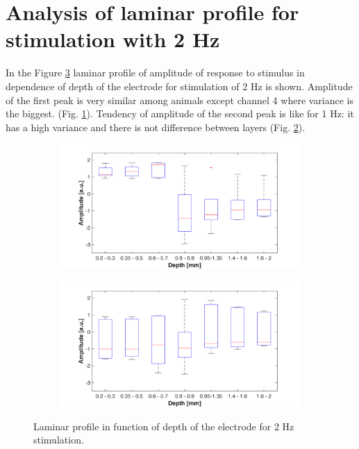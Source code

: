 \documentclass{pracalicmgr}
\begin{document}
 
 \section{Analysis of laminar profile for stimulation with 2 Hz}
  
    In the Figure \ref{rys:profil_2Hz_amp} laminar profile of amplitude of response to stimulus in dependence of depth of the electrode for stimulation of 2 Hz is shown. Amplitude of the first peak is very similar among animals except channel 4 where variance is the biggest. (Fig. \ref{rys:profil_2Hz_amp1}). Tendency of amplitude of the second peak is like for 1 Hz: it has a high variance and there is not difference between layers (Fig. \ref{rys:profil_2Hz_amp2}).
  
 	\begin{figure}[H]
 	\begin{subfigure}{.5\textwidth}
 		\centering
 		\includegraphics[width=1.\linewidth]{profile_2Hz_amp.png}
 		\caption{}
 		\label{rys:profil_2Hz_amp1}
 	\end{subfigure}%
 	\begin{subfigure}{.5\textwidth}
 		\centering
 		\includegraphics[width=1.\linewidth]{profile_2Hz_amp2.png}
 		\caption{}
 		\label{rys:profil_2Hz_amp2}
 	\end{subfigure}
 	
 	\caption{Laminar profile in function of depth of the electrode for 2 Hz stimulation.}
 	\label{rys:profil_2Hz_amp}
 \end{figure}
\end{document}

